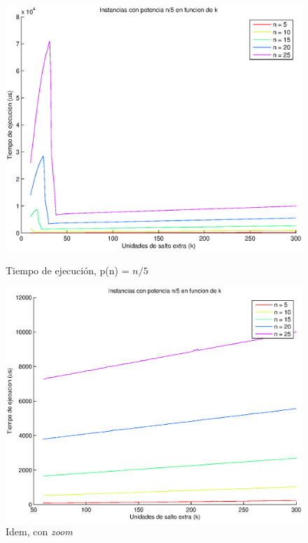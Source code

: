 \begin{figure}[H]
  \begin{minipage}{0.5\linewidth}
    \includegraphics[width=\linewidth]{img/problema3/instancia_p_20p_varios_n.eps}
    \caption{Tiempo de ejecución, p(n) = $n/5$}\label{fig:problema3-n-20}
  \end{minipage}
  \hfill
  \begin{minipage}{0.5\linewidth}
    \includegraphics[width=\linewidth]{img/problema3/instancia_p_20p_varios_n_zoom.eps}
    \caption{Idem, con \emph{zoom}}\label{fig:problema3-n-n2-20}
  \end{minipage}
\end{figure}

